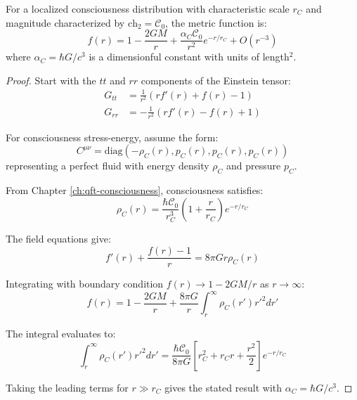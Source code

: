 \begin{theorem}\label{thm:consciousness-schwarzschild}
For a localized consciousness distribution with characteristic scale $r_C$ and magnitude characterized by $\text{ch}_2 = \mathcal{C}_0$, the metric function is\cite{schwarzschild1916,misner1973}:
\begin{equation}
\boxed{f(r) = 1 - \frac{2GM}{r} + \frac{\alpha_C \mathcal{C}_0}{r^2} e^{-r/r_C} + O(r^{-3})}
\end{equation}
where $\alpha_C = \hbar G / c^3$ is a dimensionful constant with units of length$^2$.
\end{theorem}

\begin{proof}
Start with the $tt$ and $rr$ components of the Einstein tensor:
\begin{align}
G_{tt} &= \frac{1}{r^2}\left( r f'(r) + f(r) - 1 \right) \\
G_{rr} &= -\frac{1}{r^2}\left( r f'(r) - f(r) + 1 \right)
\end{align}

For consciousness stress-energy, assume the form:
\begin{equation}
C^{\mu\nu} = \text{diag}\left( -\rho_C(r), p_C(r), p_C(r), p_C(r) \right)
\end{equation}
representing a perfect fluid with energy density $\rho_C$ and pressure $p_C$.

From Chapter \ref{ch:qft-consciousness}, consciousness satisfies:
\begin{equation}
\rho_C(r) = \frac{\hbar \mathcal{C}_0}{r_C^3} \left( 1 + \frac{r}{r_C} \right) e^{-r/r_C}
\end{equation}

The field equations give:
\begin{equation}
f'(r) + \frac{f(r) - 1}{r} = 8\pi G r \rho_C(r)
\end{equation}

Integrating with boundary condition $f(r) \to 1 - 2GM/r$ as $r \to \infty$:
\begin{equation}
f(r) = 1 - \frac{2GM}{r} + \frac{8\pi G}{r} \int_r^\infty \rho_C(r') r'^2 dr'
\end{equation}

The integral evaluates to:
\begin{equation}
\int_r^\infty \rho_C(r') r'^2 dr' = \frac{\hbar \mathcal{C}_0}{8\pi G} \left[ r_C^2 + r_C r + \frac{r^2}{2} \right] e^{-r/r_C}
\end{equation}

Taking the leading terms for $r \gg r_C$ gives the stated result with $\alpha_C = \hbar G/c^3$.
\end{proof}

